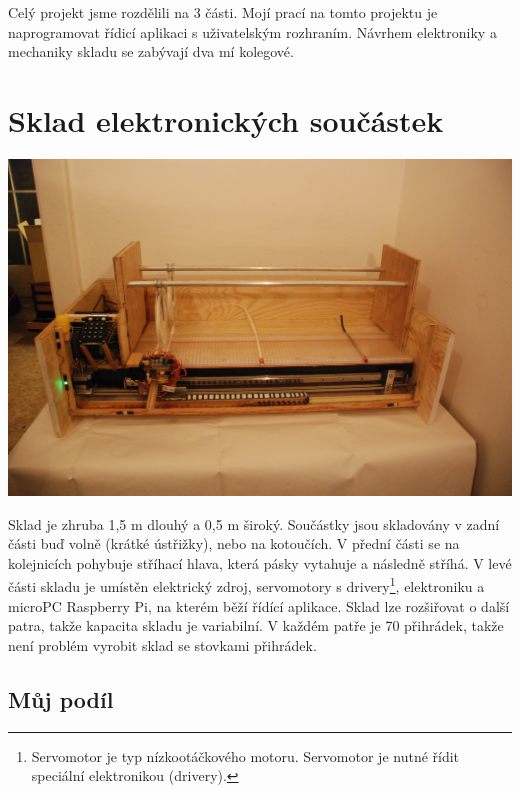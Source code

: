 \documentclass[12pt, a4paper, oneside]{article}
\begin{document}
Celý projekt jsme rozdělili na 3 části. Mojí prací na tomto projektu je naprogramovat řídicí aplikaci s uživatelským rozhraním. Návrhem elektroniky a mechaniky skladu se zabývají dva mí kolegové.


\newpage

\section{Sklad elektronických součástek}


\begin{minipage}{\textwidth}
\begin{center}
\includegraphics[scale=0.40]{img/sklad.JPG}
\\
\caption{Obr. 1: přední pohled na sklad}
\end{center}
\end{minipage}
\vspace{4mm}

Sklad je zhruba 1,5 m dlouhý a 0,5 m široký. Součástky jsou skladovány v zadní části buď volně (krátké ústřižky), nebo na kotoučích. V přední části se na kolejnicích pohybuje stříhací hlava, která pásky vytahuje a následně stříhá. V levé části skladu je umístěn elektrický zdroj, servomotory s drivery\footnote{Servomotor je typ nízkootáčkového motoru. Servomotor je nutné řídit speciální elektronikou (drivery).}, elektroniku a microPC Raspberry Pi, na kterém běží řídící aplikace. Sklad lze rozšiřovat o další patra, takže kapacita skladu je variabilní. V každém patře je 70 přihrádek, takže není problém vyrobit sklad se stovkami přihrádek.

\subsection{Můj podíl}
\end{document}
